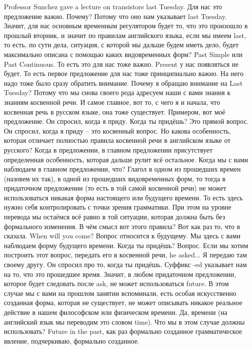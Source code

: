 \documentclass[main.tex]{subfiles}
\begin{document}
Professor Sunchez gave a lecture on transistors last Tuesday.
Для нас это предложение важно.
Почему?
Потому что оно нам указывает last Tuesday.
Значит, для нас основным временным регулятором будет то, что это произошло в прошлый вторник, и значит по правилам английского языка, если мы имеем last, то есть, по сути дела, ситуация, с которой мы дальше будем иметь дело, будет максимально описана с помощью каких видовременных форм?
Past Simple или Past Continuous.
То есть это для нас тоже важно.
Present у нас появляться не будет.
То есть первое предложение для нас тоже принципиально важно.
На него надо тоже было сразу обратить внимание.
Почему я обращаю внимание на Last Tuesday?
Потому что мы снова своего рода адресуем наши с вами знания к знаниям косвенной речи.
И самое главное, вот то, с чего я и начала, что косвенная речь в русском языке, она тоже существует.
Примером, вот моё предложение.
Он спросил, когда я приду.
Когда ты придёшь?
Это прямой вопрос.
Он спросил, когда я приду -- это косвенный вопрос.
Но какова особенность, которая отличает полностью правила косвенной речи в английском языке от русского?
Когда в предложении, в главном предложении присутствует определенная особенность, которая дальше рулит всё остальное.
Когда мы с вами наблюдаем в главном предложении, что?
Глагол в одном из прошедших времен (назовем их так), в одной из прошедших видовременных форм, то тогда в придаточном предложении (то есть в той самой косвенной речи) не может использоваться никакая форма настоящего или будущего времени.
То есть здесь нужно себя контролировать с точки зрения грамматики.
При этом на уровне перевода мы остаёмся всё равно в той ситуации, которая должна быть без формального изменения.
В чём смысл вот этого правила?
Вот как раз то, что я сказала.
When will you come?
Вопрос относится к будущему.
Мы здесь с вами наблюдаем форму будущего времени.
Когда ты придёшь? Вопрос.
Если мы хотим построить этот вопрос, передать его в косвенной речи, he asked...
Я передаю там своему другу.
Он спросил про то, когда ты придёшь.
Суффикс -ed указывает нам на то, что это прошедшее время. 
Значит, в любом придаточном предложении, которое будет следовать после ask, не может использоваться future.
В этом случае мы с вами на прошлом занятии вспоминали, есть особая искусственно созданная форма, которая не существует, не может описывать никакое реальное действие в нашем философском или физическом времени.
Да, времени (на английский язык мы переводим это словом time).
Что мы в этом случае должны использовать?
Future in the past, как раз формально созданное грамматическое явление, подчеркиваю, формально созданное.
\end{document}
